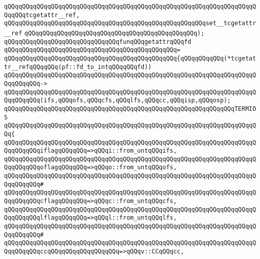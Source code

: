 \verb|qQQqqQQqqQQqqQQqqQQqqQQqqQQqqQQqqQQqqQQqqQQqqQQqqQQqqQQqqQQqqQQqqQQqqQQqqQQqtcgetattr__ref,|\newline
\verb|qQQqqQQqqQQqqQQqqQQqqQQqqQQqqQQqqQQqqQQqqQQqqQQqqQQqqQQqset__tcgetattr__ref|\newline
\verb|qQQqqQQqqQQqqQQqqQQqqQQqqQQqqQQqqQQqqQQqqQQqqQQq);|\newline
\newline
\newline
\verb|qQQqqQQqqQQqqQQqqQQqqQQqqQQqqQQqfunqQQqgetattrqQQqfd|\newline
\verb|qQQqqQQqqQQqqQQqqQQqqQQqqQQqqQQqqQQqqQQqqQQqqQQq=|\newline
\verb|qQQqqQQqqQQqqQQqqQQqqQQqqQQqqQQqqQQqqQQqqQQqqQQq{qQQqqQQqqQQq(*tcgetattr__refqQQqqQQq(pf::fd_to_intqQQqqQQqfd))|\newline
\verb|qQQqqQQqqQQqqQQqqQQqqQQqqQQqqQQqqQQqqQQqqQQqqQQqqQQqqQQqqQQqqQQqqQQqqQQqqQQqqQQq->|\newline
\verb|qQQqqQQqqQQqqQQqqQQqqQQqqQQqqQQqqQQqqQQqqQQqqQQqqQQqqQQqqQQqqQQqqQQqqQQqqQQqqQQq(ifs,qQQqofs,qQQqcfs,qQQqlfs,qQQqcc,qQQqisp,qQQqosp);|\newline
\newline
\verb|qQQqqQQqqQQqqQQqqQQqqQQqqQQqqQQqqQQqqQQqqQQqqQQqqQQqqQQqqQQqqQQqTERMIOS|\newline
\verb|qQQqqQQqqQQqqQQqqQQqqQQqqQQqqQQqqQQqqQQqqQQqqQQqqQQqqQQqqQQqqQQqqQQqqQQq{|\newline
\verb|qQQqqQQqqQQqqQQqqQQqqQQqqQQqqQQqqQQqqQQqqQQqqQQqqQQqqQQqqQQqqQQqqQQqqQQqqQQqqQQqiflagqQQqqQQq=>qQQqi::from_untqQQqifs,|\newline
\verb|qQQqqQQqqQQqqQQqqQQqqQQqqQQqqQQqqQQqqQQqqQQqqQQqqQQqqQQqqQQqqQQqqQQqqQQqqQQqqQQqoflagqQQqqQQq=>qQQqo::from_untqQQqofs,|\newline
\verb|qQQqqQQqqQQqqQQqqQQqqQQqqQQqqQQqqQQqqQQqqQQqqQQqqQQqqQQqqQQqqQQqqQQqqQQqqQQqqQQq#|\newline
\verb|qQQqqQQqqQQqqQQqqQQqqQQqqQQqqQQqqQQqqQQqqQQqqQQqqQQqqQQqqQQqqQQqqQQqqQQqqQQqqQQqcflagqQQqqQQq=>qQQqc::from_untqQQqcfs,|\newline
\verb|qQQqqQQqqQQqqQQqqQQqqQQqqQQqqQQqqQQqqQQqqQQqqQQqqQQqqQQqqQQqqQQqqQQqqQQqqQQqqQQqlflagqQQqqQQq=>qQQql::from_untqQQqlfs,|\newline
\verb|qQQqqQQqqQQqqQQqqQQqqQQqqQQqqQQqqQQqqQQqqQQqqQQqqQQqqQQqqQQqqQQqqQQqqQQqqQQqqQQq#|\newline
\verb|qQQqqQQqqQQqqQQqqQQqqQQqqQQqqQQqqQQqqQQqqQQqqQQqqQQqqQQqqQQqqQQqqQQqqQQqqQQqqQQqccqQQqqQQqqQQqqQQqqQQq=>qQQqv::CCqQQqcc,|\newline
